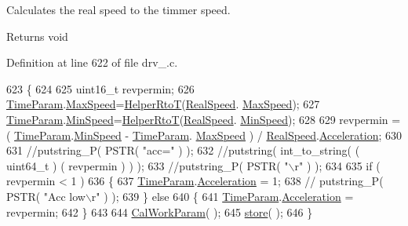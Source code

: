 Calculates the real speed to the timmer speed. \begin{DoxyReturn}{Returns}
void 
\end{DoxyReturn}


Definition at line 622 of file drv\-\_.\-c.


\begin{DoxyCode}
623 \{
624     
625     uint16\_t revpermin;
626     \hyperlink{drv__8825_8c_a7d20b8cec6f96108790d4bf76b9c469d}{TimeParam}.\hyperlink{structMotor__Parameters_a501458e333945f49f03c295e2f49e3b9}{MaxSpeed}=\hyperlink{group__DRV8825_ga8f3808b2e4aa3b2a8f6467a2aaa31995}{HelperRtoT}(\hyperlink{drv__8825_8c_a2e720ed1ed0ef90dba27c1f246048dcd}{RealSpeed}.
      \hyperlink{structMotor__Parameters_a501458e333945f49f03c295e2f49e3b9}{MaxSpeed});
627     \hyperlink{drv__8825_8c_a7d20b8cec6f96108790d4bf76b9c469d}{TimeParam}.\hyperlink{structMotor__Parameters_aaf0ac3ed818f5c89cc86ea1d9174dc43}{MinSpeed}=\hyperlink{group__DRV8825_ga8f3808b2e4aa3b2a8f6467a2aaa31995}{HelperRtoT}(\hyperlink{drv__8825_8c_a2e720ed1ed0ef90dba27c1f246048dcd}{RealSpeed}.
      \hyperlink{structMotor__Parameters_aaf0ac3ed818f5c89cc86ea1d9174dc43}{MinSpeed});
628     
629     revpermin = ( \hyperlink{drv__8825_8c_a7d20b8cec6f96108790d4bf76b9c469d}{TimeParam}.\hyperlink{structMotor__Parameters_aaf0ac3ed818f5c89cc86ea1d9174dc43}{MinSpeed} - \hyperlink{drv__8825_8c_a7d20b8cec6f96108790d4bf76b9c469d}{TimeParam}.
      \hyperlink{structMotor__Parameters_a501458e333945f49f03c295e2f49e3b9}{MaxSpeed} ) / \hyperlink{drv__8825_8c_a2e720ed1ed0ef90dba27c1f246048dcd}{RealSpeed}.\hyperlink{structMotor__Parameters_aa9f1146edc6d945d535eec80a01481f1}{Acceleration};
630 
631     \textcolor{comment}{//putstring\_P( PSTR( "acc=" ) );}
632     \textcolor{comment}{//putstring( int\_to\_string( ( uint64\_t ) ( revpermin ) ) );}
633     \textcolor{comment}{//putstring\_P( PSTR( "\(\backslash\)r" ) );}
634 
635     if ( revpermin < 1 )
636     \{
637         \hyperlink{drv__8825_8c_a7d20b8cec6f96108790d4bf76b9c469d}{TimeParam}.\hyperlink{structMotor__Parameters_aa9f1146edc6d945d535eec80a01481f1}{Acceleration} = 1;
638         \textcolor{comment}{//  putstring\_P( PSTR( "Acc  low\(\backslash\)r" ) );}
639     \} \textcolor{keywordflow}{else}
640     \{
641         \hyperlink{drv__8825_8c_a7d20b8cec6f96108790d4bf76b9c469d}{TimeParam}.\hyperlink{structMotor__Parameters_aa9f1146edc6d945d535eec80a01481f1}{Acceleration} = revpermin;
642     \}
643 
644     \hyperlink{group__DRV8825_ga3389079a7106f1e741c0bc447dfbcbca}{CalWorkParam}( );
645     \hyperlink{group__DRV8825_gaaefaac2ed4c54f2008d8d236392c7261}{store}( );
646 \}
\end{DoxyCode}
